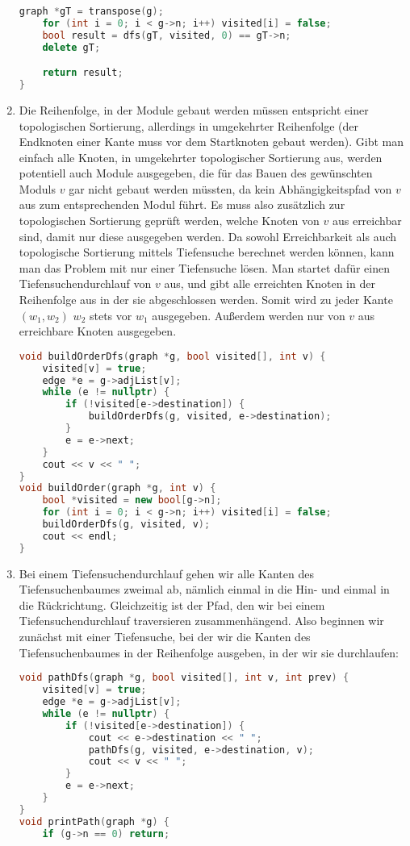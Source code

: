 \documentclass[11pt,a4paper]{article}
\begin{document}
\begin{loesung}
\begin{enumerate}
\begin{lstlisting}[language=c++]
    graph *gT = transpose(g);
    for (int i = 0; i < g->n; i++) visited[i] = false;
    bool result = dfs(gT, visited, 0) == gT->n;
    delete gT;

    return result;
}
        \end{lstlisting}

        \item
        Die Reihenfolge, in der Module gebaut werden müssen entspricht einer topologischen Sortierung, allerdings in umgekehrter Reihenfolge (der Endknoten einer Kante muss vor dem Startknoten gebaut werden).
        Gibt man einfach alle Knoten, in umgekehrter topologischer Sortierung aus, werden potentiell auch Module ausgegeben, die für das Bauen des gewünschten Moduls $v$ gar nicht gebaut werden müssten, da kein Abhängigkeitspfad von $v$ aus zum entsprechenden Modul führt.
        Es muss also zusätzlich zur topologischen Sortierung geprüft werden, welche Knoten von $v$ aus erreichbar sind, damit nur diese ausgegeben werden.
        Da sowohl Erreichbarkeit als auch topologische Sortierung mittels Tiefensuche berechnet werden können, kann man das Problem mit nur einer Tiefensuche lösen.
        Man startet dafür einen Tiefensuchendurchlauf von $v$ aus, und gibt alle erreichten Knoten in der Reihenfolge aus in der sie abgeschlossen werden.
        Somit wird zu jeder Kante $(w_1, w_2)$ $w_2$ stets vor $w_1$ ausgegeben.
        Außerdem werden nur von $v$ aus erreichbare Knoten ausgegeben.
        \begin{lstlisting}[language=c++]
void buildOrderDfs(graph *g, bool visited[], int v) {
    visited[v] = true;
    edge *e = g->adjList[v];
    while (e != nullptr) {
        if (!visited[e->destination]) {
            buildOrderDfs(g, visited, e->destination);
        }
        e = e->next;
    }
    cout << v << " ";
}
void buildOrder(graph *g, int v) {
    bool *visited = new bool[g->n];
    for (int i = 0; i < g->n; i++) visited[i] = false;
    buildOrderDfs(g, visited, v);
    cout << endl;
}
        \end{lstlisting}

        \item
        Bei einem Tiefensuchendurchlauf gehen wir alle Kanten des Tiefensuchenbaumes zweimal ab, nämlich einmal in die Hin- und einmal in die Rückrichtung.
        Gleichzeitig ist der Pfad, den wir bei einem Tiefensuchendurchlauf traversieren zusammenhängend.
        Also beginnen wir zunächst mit einer Tiefensuche, bei der wir die Kanten des Tiefensuchenbaumes in der Reihenfolge ausgeben, in der wir sie durchlaufen:
        \begin{lstlisting}[language=c++]
void pathDfs(graph *g, bool visited[], int v, int prev) {
    visited[v] = true;
    edge *e = g->adjList[v];
    while (e != nullptr) {
        if (!visited[e->destination]) {
            cout << e->destination << " ";
            pathDfs(g, visited, e->destination, v);
            cout << v << " ";
        }
        e = e->next;
    }
}
void printPath(graph *g) {
    if (g->n == 0) return;


\end{lstlisting}
\end{enumerate}
\end{loesung}
\end{document}

